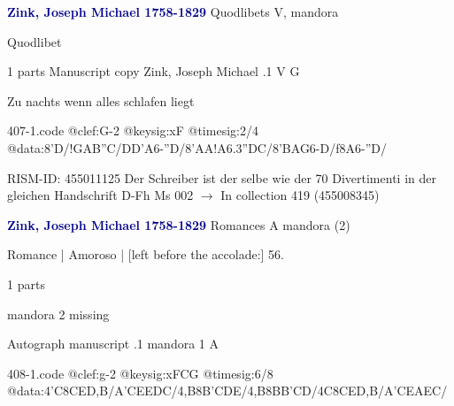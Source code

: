 \documentclass[twocolumn]{book}
\begin{document}
\newline \par \vspace{7pt} \textcolor{darkblue}{\textbf{Zink, Joseph Michael  1758-1829}}
\newline Quodlibets    
\newline V, mandora
\newline \begin{itshape}[heading, f.51v:] Quodlibet\end{itshape} 
\newline \textcolor{darkblue}{}  1 parts  
\newline Manuscript copy
\newline Zink, Joseph Michael
.1  V  G
\newline \begin{footnotesize} Zu nachts wenn alles schlafen liegt \end{footnotesize}  
\begin{filecontents*}{407-1.code}
@clef:G-2
@keysig:xF
@timesig:2/4
@data:8'D/!GAB''C/DD'A6-''D/8'AA!{A6.3''DC}/8'BAG6-D/f8A6-''D/
\end{filecontents*}
\newline
%

\newline RISM-ID: 455011125
\newline Der Schreiber ist der selbe wie der 70 Divertimenti in der gleichen Handschrift
\newline D-Fh  Ms 002
\newline $\rightarrow$ In collection 419 (455008345)

\newline \par \vspace{7pt} \textcolor{darkblue}{\textbf{Zink, Joseph Michael  1758-1829}}
\newline Romances  A  
\newline mandora (2)
\newline \begin{itshape}[f.29v, at left:] Romance | Amoroso | [left before the accolade:] 56.\end{itshape} 
\newline \textcolor{darkblue}{}  1 parts  
\newline \begin{small} mandora 2 missing\end{small} 
\newline Autograph manuscript
.1  mandora 1  A  
\begin{filecontents*}{408-1.code}
@clef:g-2
@keysig:xFCG
@timesig:6/8
@data:4'C8CED,B/A'CEEDC/4,B8B'CDE/4,B8BB'CD/4C8CED,B/A'CEAEC/
\end{filecontents*}
\newline
%
\end{document}
